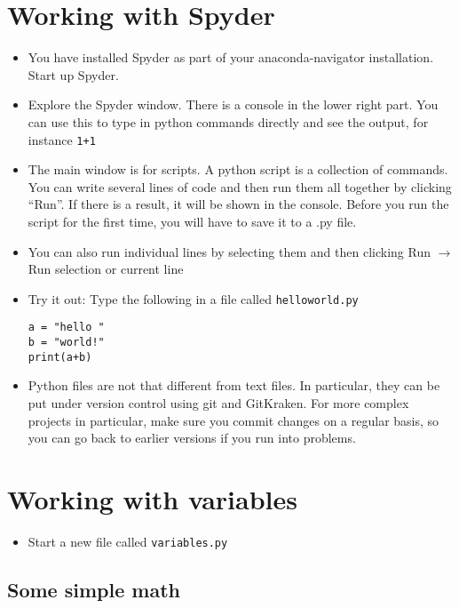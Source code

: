 \documentclass[pdflatex,a4paper]{article}
\begin{document}
\section{Working with Spyder}

\begin{itemize}
\item
You have installed Spyder as part of your anaconda-navigator installation. Start up Spyder.
\item
Explore the Spyder window. There is a console in the lower right part. You can use this to type in python commands directly and see the output, for instance \verb=1+1=
\item
The main window is for scripts. A python script is a collection of commands. You can write several lines of code and then run them all together by clicking ``Run''.  If there is a result, it will be shown in the console. Before you run the script for the first time, you will have to save it to a .py file.
\item
You can also run individual lines by selecting them and then clicking Run \(\rightarrow\) Run selection or current line
\item
Try it out: Type the following in a file called \verb=helloworld.py=
\begin{verbatim}
a = "hello "
b = "world!"
print(a+b)
\end{verbatim}
\item
Python files are not that different from text files. In particular, they can be put under version control using git and GitKraken. For more complex projects in particular, make sure you commit changes on a regular basis, so you can go back to earlier versions if you run into problems.
\end{itemize}


\section{Working with variables}

\begin{itemize}
\item
Start a new file called \verb=variables.py=
\end{itemize}


\subsection{Some simple math}
\end{document}
